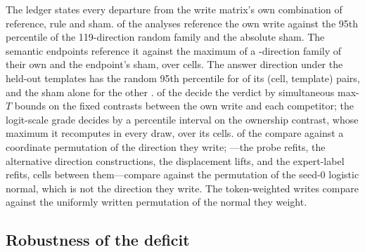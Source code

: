 The ledger states every departure from the write matrix's own combination of reference, rule and sham. \cfLedgerFullReference{} of the \cfLedgerAnalyses{} analyses reference the own write against the 95th percentile of the 119-direction random family and the absolute sham. The semantic endpoints reference it against the maximum of a \cfSemLedgerRandom{}-direction family of their own and the endpoint's sham, over \cfSemLedgerCells{} cells. The answer direction under the held-out templates has the random 95th percentile for \cfAnsdirtRefPairs{} of its \cfAnsdirtLedgerPairs{} (cell, template) pairs, and the sham alone for the other \cfAnsdirtShamPairs{}. \cfLedgerMaxT{} of the \cfLedgerAnalyses{} decide the verdict by simultaneous max-$T$ bounds on the fixed contrasts between the own write and each competitor; the logit-scale grade decides by a percentile interval on the ownership contrast, whose maximum it recomputes in every draw, over its \cfLedgerPercentileCells{} cells. \cfLedgerOwnSham{} of the \cfLedgerAnalyses{} compare against a coordinate permutation of the direction they write; \cfLedgerSeedShamWord{}---the probe refits, the alternative direction constructions, the displacement lifts, and the expert-label refits, \cfLedgerSeedShamCells{} cells between them---compare against the permutation of the seed-0 logistic normal, which is not the direction they write. The token-weighted writes compare against the uniformly written permutation of the normal they weight.




\subsection{Robustness of the deficit}
\label{app:cf-robustness}

